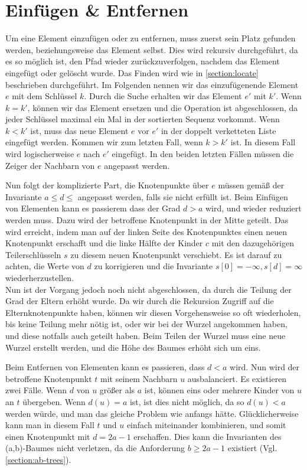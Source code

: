 \section{Einfügen \& Entfernen}
\label{section:insert-remove}

Um eine Element einzufügen oder zu entfernen, muss zuerst sein Platz gefunden werden, beziehungsweise das Element selbst. Dies wird rekursiv durchgeführt, da es so möglich ist, den Pfad wieder zurückzuverfolgen, nachdem das Element eingefügt oder gelöscht wurde. Das Finden wird wie in \autoref{section:locate} beschrieben durchgeführt. Im Folgenden nennen wir das einzufügenende Element $e$ mit dem Schlüssel $k$. Durch die Suche erhalten wir das Element $e'$ mit $k'$. Wenn $k = k'$, können wir das Element ersetzen und die Operation ist abgeschlossen, da jeder Schlüssel maximal ein Mal in der sortierten Sequenz vorkommt. Wenn $k < k'$ ist, muss das neue Element $e$ vor $e'$ in der doppelt verketteten Liste eingefügt werden. Kommen wir zum letzten Fall, wenn $k > k'$ ist. In diesem Fall wird logischerweise $e$ nach $e'$ eingefügt. In den beiden letzten Fällen müssen die Zeiger der Nachbarn von $e$ angepasst werden.
\par
Nun folgt der komplizierte Part, die Knotenpunkte über $e$ müssen gemäß der Invariante $a \leq d \leq$ angepasst werden, falls sie nicht erfüllt ist. Beim Einfügen von Elementen kann es passierem dass der Grad $d > a$ wird, und wieder reduziert werden muss. Dazu wird der betroffene Knotenpunkt in der Mitte geteilt. Das wird erreicht, indem man auf der linken Seite des Knotenpunktes einen neuen Knotenpunkt erschafft und die linke Hälfte der Kinder $c$ mit den dazugehörigen Teilerschlüsseln $s$ zu diesem neuen Knotenpunkt verschiebt. Es ist darauf zu achten, die Werte von $d$ zu korrigieren und die Invariante $s[0] = - \infty, s[d] = \infty$ wiederherzustellen.
\\
Nun ist der Vorgang jedoch noch nicht abgeschlossen, da durch die Teilung der Grad der Eltern erhöht wurde. Da wir durch die Rekursion Zugriff auf die Elternknotenpunkte haben, können wir diesen Vorgehensweise so oft wiederholen, bis keine Teilung mehr nötig ist, oder wir bei der Wurzel angekommen haben, und diese notfalls auch geteilt haben. Beim Teilen der Wurzel muss eine neue Wurzel erstellt werden, und die Höhe des Baumes erhöht sich um eins.
\par
Beim Entfernen von Elementen kann es passieren, dass $d < a$ wird. Nun wird der betroffene Knotenpunkt $t$ mit seinem Nachbarn $u$ ausbalanciert. Es existieren zwei Fälle. Wenn $d$ von $u$ größer als $a$ ist, können eins oder mehrere Kinder von $u$ an $t$ übergeben. Wenn $d(u) = a$ ist, ist dies nicht möglich, da so $d(u) < a$ werden würde, und man das gleiche Problem wie anfangs hätte. Glücklicherweise kann man in diesem Fall $t$ und $u$ einfach miteinander kombinieren, und somit einen Knotenpunkt mit $d = 2a-1$ erschaffen. Dies kann die Invarianten des (a,b)-Baumes nicht verletzen, da die Anforderung $b \geq 2a-1$ existiert (Vgl. \autoref{section:ab-trees}).
